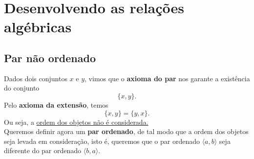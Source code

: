 \section{Desenvolvendo as relações algébricas}
\subsection{Par não ordenado}
Dados dois conjuntos $x$ e $y$, vimos que o \textbf{axioma do par} nos garante a existência do conjunto
$$\{x, y\}.$$
Pelo \textbf{axioma da extensão}, temos
$$\{x,y\} = \{y,x\}.$$
Ou seja, a \underline{ordem dos objetos não é considerada.}\\
Queremos definir agora um \textbf{par ordenado}, de tal modo que a ordem dos objetos seja levada em consideração, isto é, queremos que o par ordenado $\langle a ,b\rangle$ seja diferente do par ordenado $\langle b ,a\rangle$.
